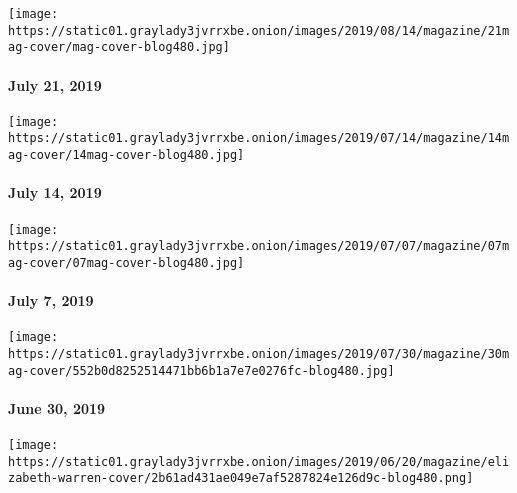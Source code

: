 \href{https://www.nytimes3xbfgragh.onion/issue/magazine/2019/08/14/the-72119-issue}{}

\texttt{[image: https://static01.graylady3jvrrxbe.onion/images/2019/08/14/magazine/21mag-cover/mag-cover-blog480.jpg]}

\hypertarget{july-21-2019}{%
\paragraph{July 21, 2019}\label{july-21-2019}}

\href{https://www.nytimes3xbfgragh.onion/issue/magazine/2019/07/11/the-71419-issue}{}

\texttt{[image: https://static01.graylady3jvrrxbe.onion/images/2019/07/14/magazine/14mag-cover/14mag-cover-blog480.jpg]}

\hypertarget{july-14-2019}{%
\paragraph{July 14, 2019}\label{july-14-2019}}

\href{https://www.nytimes3xbfgragh.onion/issue/magazine/2019/07/09/the-7719-issue}{}

\texttt{[image: https://static01.graylady3jvrrxbe.onion/images/2019/07/07/magazine/07mag-cover/07mag-cover-blog480.jpg]}

\hypertarget{july-7-2019}{%
\paragraph{July 7, 2019}\label{july-7-2019}}

\href{https://www.nytimes3xbfgragh.onion/issue/magazine/2019/07/01/the-63019-issue}{}

\texttt{[image: https://static01.graylady3jvrrxbe.onion/images/2019/07/30/magazine/30mag-cover/552b0d8252514471bb6b1a7e7e0276fc-blog480.jpg]}

\hypertarget{june-30-2019}{%
\paragraph{June 30, 2019}\label{june-30-2019}}

\href{https://www.nytimes3xbfgragh.onion/issue/magazine/2019/06/25/the-62319-issue}{}

\texttt{[image: https://static01.graylady3jvrrxbe.onion/images/2019/06/20/magazine/elizabeth-warren-cover/2b61ad431ae049e7af5287824e126d9c-blog480.png]}

